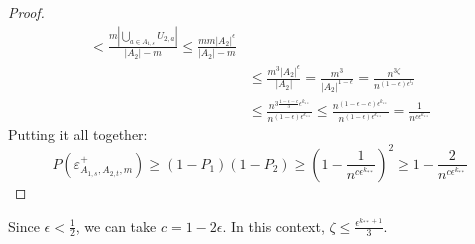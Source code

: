 \begin{proof}
\[\begin{split}
                            < \frac{m |\bigcup_{a \in A_{1,s}} U_{2,a}|}{|A_2| - m}
                            \leq \frac{m m |A_2|^\epsilon}{|A_2| - m} \\
                        & \leq \frac{m^3 |A_2|^\epsilon}{|A_2|}
                            = \frac{m^3}{|A_2|^{1-\epsilon}}
                            = \frac{n^{3 \zeta}}{n^{(1-\epsilon)\epsilon^{l_2}}} \\ %
                        & \leq \frac{n^{3\frac{1-\epsilon-c}{3} \epsilon^{k_{**}}}}{n^{(1-\epsilon)\epsilon^{k_{**}}}}
                            \leq \frac{n^{(1-\epsilon-c) \epsilon^{k_{**}}}}{n^{(1-\epsilon)\epsilon^{k_{**}}}}
                            = \frac{1}{n^{c \epsilon^{k_{**}}}}
                \end{split}
            \]
            Putting it all together:
            \[
                P(\varepsilon^+_{A_{1,s},A_{2,t},m})
                    \geq (1 - P_1) (1 - P_2)
                    \geq \left(1 - \frac{1}{n^{c \epsilon^{k_{**}}}}\right)^2
                    \geq 1 - \frac{2}{n^{c\epsilon^{k_{**}}}}
            \]
        \end{proof}

    \remark\label{subpair_bound_specification}
    Since $\epsilon < \frac{1}{2}$, we can take $c = 1 - 2\epsilon$.
    In this context, $\zeta \leq \frac{\epsilon^{k_{**}+1}}{3}$.

